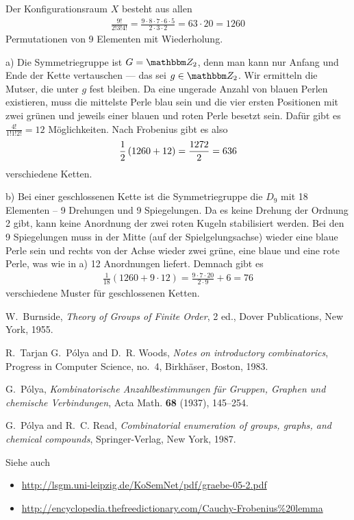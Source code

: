 \documentclass[12pt,a4paper]{article}
\begin{document}
\begin{loesung}
Der Konfigurationsraum $X$ besteht aus allen 
\begin{gather*}
  \frac{ 9!}{2!3!4!}  =\frac{9\cdot 8\cdot 7\cdot 6\cdot 5}{2\cdot 3\cdot 2}=
  63 \cdot 20= 1260
\end{gather*}
Permutationen von 9 Elementen mit Wiederholung.

a) Die Symmetriegruppe ist $G=\Z_2$, denn man kann nur Anfang und Ende der
Kette vertauschen --- das sei $g\in \Z_2$.  Wir ermitteln die Mutser, die unter
$g$ fest bleiben.  Da eine ungerade Anzahl von blauen Perlen existieren, muss
die mittelste Perle blau sein und die vier ersten Positionen mit zwei grünen
und jeweils einer blauen und roten Perle besetzt sein. Dafür gibt es
$\frac{4!}{1!1!2!}= 12 $ Möglichkeiten. Nach Frobenius gibt es also
\begin{gather*}
  \frac{1}{2}\left( 1260 + 12\right)= \frac{1272}{2} = 636
\end{gather*}
verschiedene Ketten.

b) Bei einer geschlossenen Kette ist die Symmetriegruppe die $D_9$ mit 18
Elementen -- 9 Drehungen und 9 Spiegelungen. Da es keine Drehung der Ordnung 2
gibt, kann keine Anordnung der zwei roten Kugeln stabilisiert werden.  Bei den
9 Spiegelungen muss in der Mitte (auf der Spielgelungsachse) wieder eine blaue
Perle sein und rechts von der Achse wieder zwei grüne, eine blaue und eine
rote Perle, was wie in a) 12 Anordnungen liefert. Demnach gibt es
\begin{gather*}
  \frac{1}{18} \left(1260 + 9 \cdot 12\right)=\frac{9\cdot 7\cdot 20}{2\cdot
    9} + 6= 76
\end{gather*}
verschiedene Muster für geschlossenen Ketten.
\end{loesung}

\nocite{b-PolyaRead}
\nocite{b-PolyaTarjan}
\nocite{a-Polya}
\nocite{b-Burnside}

\providecommand{\bysame}{\leavevmode\hbox to3em{\hrulefill}\thinspace}
\begin{thebibliography}{1}

W.~Burnside, \emph{Theory of Groups of Finite Order}, 2 ed., Dover
  Publications, New York, 1955.

R.~Tarjan G.~P{\'o}lya and D.~R. Woods, \emph{Notes on introductory
  combinatorics}, Progress in Computer Science, no.~4, Birkh{\"a}ser, Boston,
  1983.

G.~P{\'o}lya, \emph{Kombinatorische {A}nzahlbestimmungen f{\"u}r {G}ruppen,
  {G}raphen und chemische {V}erbindungen}, Acta Math. \textbf{68} (1937),
  145--254.

G.~P{\'o}lya and R.~C. Read, \emph{Combinatorial enumeration of groups, graphs,
  and chemical compounds}, Springer-Verlag, New York, 1987.

\end{thebibliography}

Siehe auch 
\begin{itemize}
\item \url{http://lsgm.uni-leipzig.de/KoSemNet/pdf/graebe-05-2.pdf}
\item \url{http://encyclopedia.thefreedictionary.com/Cauchy-Frobenius%20lemma}
\end{itemize}
\end{document}

